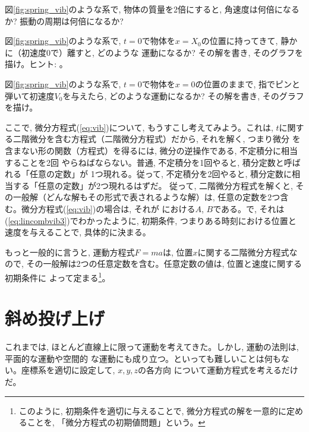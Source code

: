 %
\begin{q}\label{q:harmonic_osci0}
図\ref{fig:spring_vib}のような系で, 物体の質量を2倍にすると, 
角速度は何倍になるか? 振動の周期は何倍になるか?
\end{q}
\vspace{0.2cm}

%
\begin{q}\label{q:harmonic_osci1}
図\ref{fig:spring_vib}のような系で, $t=0$で物体を$x=X_0$の位置に持ってきて, 
静かに（初速度0で）離すと, どのような
運動になるか? その解を書き, そのグラフを描け。ヒント: 。
\end{q}
\vspace{0.2cm}

%
\begin{q}\label{q:harmonic_osci2}
図\ref{fig:spring_vib}のような系で, $t=0$で物体を$x=0$の位置のままで, 
指でピンと弾いて初速度$V_0$を与えたら, 
どのような運動になるか? その解を書き, そのグラフを描け。
\end{q}
\vspace{0.2cm}

ここで, 微分方程式(\ref{eq:vib})について, もうすこし考えてみよう。これは, 
$t$に関する二階微分を含む方程式（二階微分方程式）だから, それを解く, つまり微分
を含まない形の関数（方程式）を得るには, 微分の逆操作である, 不定積分に相当することを2回
やらねばならない。普通, 不定積分を1回やると, 積分定数と呼ばれる「任意の定数」が
1つ現れる。従って, 不定積分を2回やると, 積分定数に相当する「任意の定数」が2つ現れるはずだ。
従って, 二階微分方程式を解くと, その一般解（どんな解もその形式で表されるような解）は, 
任意の定数を2つ含む。微分方程式(\ref{eq:vib})の場合は, それが
における$A$, $B$である。で, それは(\ref{eq:lincombvib3})でわかったように, 初期条件, 
つまりある時刻における位置と速度を与えることで, 具体的に決まる。

もっと一般的に言うと, 運動方程式$F=ma$は, 位置$x$に関する二階微分方程式なので, 
その一般解は2つの任意定数を含む。任意定数の値は, 位置と速度に関する初期条件に
よって定まる\footnote{このように, 初期条件を適切に与えることで, 微分方程式の解を一意的に定めることを, 
「微分方程式の初期値問題」という。}。
\hv





\section{斜め投げ上げ}

これまでは, ほとんど直線上に限って運動を考えてきた。しかし, 運動の法則は, 平面的な運動や空間的
な運動にも成り立つ。といっても難しいことは何もない。座標系を適切に設定して, $x, y, z$の各方向
について運動方程式を考えるだけだ。\mv

